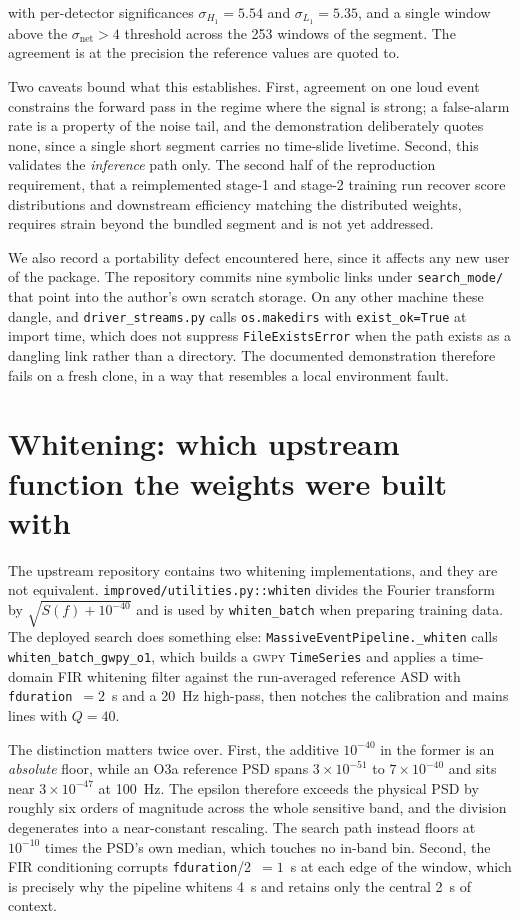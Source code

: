 \documentclass[11pt]{article}
\begin{document}
with per-detector significances $\sigma_{H_1}=5.54$ and $\sigma_{L_1}=5.35$, and a single
window above the $\sigma_\mathrm{net}>4$ threshold across the 253 windows of the segment.
The agreement is at the precision the reference values are quoted to.

Two caveats bound what this establishes. First, agreement on one loud event constrains
the forward pass in the regime where the signal is strong; a false-alarm rate is a
property of the noise tail, and the demonstration deliberately quotes none, since a
single short segment carries no time-slide livetime. Second, this validates the
\emph{inference} path only. The second half of the reproduction requirement, that a
reimplemented stage-1 and stage-2 training run recover score distributions and
downstream efficiency matching the distributed weights, requires strain beyond the
bundled segment and is not yet addressed.

We also record a portability defect encountered here, since it affects any new user of
the package. The repository commits nine symbolic links under \texttt{search\_mode/}
that point into the author's own scratch storage. On any other machine these dangle,
and \texttt{driver\_streams.py} calls \texttt{os.makedirs} with \texttt{exist\_ok=True}
at import time, which does not suppress \texttt{FileExistsError} when the path exists as
a dangling link rather than a directory. The documented demonstration therefore fails on
a fresh clone, in a way that resembles a local environment fault.

\section{Whitening: which upstream function the weights were built with}
\label{sec:whitening}

The upstream repository contains two whitening implementations, and they are not
equivalent. \texttt{improved/utilities.py::whiten} divides the Fourier transform by
$\sqrt{S(f) + 10^{-40}}$ and is used by \texttt{whiten\_batch} when preparing training
data. The deployed search does something else: \texttt{MassiveEventPipeline.\_whiten}
calls \texttt{whiten\_batch\_gwpy\_o1}, which builds a \textsc{gwpy}
\texttt{TimeSeries} and applies a time-domain FIR whitening filter against the
run-averaged reference ASD with \texttt{fduration}~$=2$~s and a 20~Hz high-pass, then
notches the calibration and mains lines with $Q=40$.

The distinction matters twice over. First, the additive $10^{-40}$ in the former is an
\emph{absolute} floor, while an O3a reference PSD spans $3\times10^{-51}$ to
$7\times10^{-40}$ and sits near $3\times10^{-47}$ at 100~Hz. The epsilon therefore
exceeds the physical PSD by roughly six orders of magnitude across the whole sensitive
band, and the division degenerates into a near-constant rescaling. The search path
instead floors at $10^{-10}$ times the PSD's own median, which touches no in-band bin.
Second, the FIR conditioning corrupts \texttt{fduration}/2~$=1$~s at each edge of the
window, which is precisely why the pipeline whitens 4~s and retains only the central
2~s of context.
\end{document}
